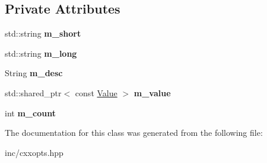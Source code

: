 \subsection*{Private Attributes}
\begin{DoxyCompactItemize}
\item 
std\+::string {\bfseries m\+\_\+short}\hypertarget{classcxxopts_1_1OptionDetails_a4454eb1ffedcf5656ab408da51542dad}{}\label{classcxxopts_1_1OptionDetails_a4454eb1ffedcf5656ab408da51542dad}

\item 
std\+::string {\bfseries m\+\_\+long}\hypertarget{classcxxopts_1_1OptionDetails_a15317e92ab6acd722736d8a6ef0dfab0}{}\label{classcxxopts_1_1OptionDetails_a15317e92ab6acd722736d8a6ef0dfab0}

\item 
String {\bfseries m\+\_\+desc}\hypertarget{classcxxopts_1_1OptionDetails_aa34bf6a94eeb9b914b96344f52519e16}{}\label{classcxxopts_1_1OptionDetails_aa34bf6a94eeb9b914b96344f52519e16}

\item 
std\+::shared\+\_\+ptr$<$ const \hyperlink{classcxxopts_1_1Value}{Value} $>$ {\bfseries m\+\_\+value}\hypertarget{classcxxopts_1_1OptionDetails_af610b82c4f86648ac54c7d2b2639e7c0}{}\label{classcxxopts_1_1OptionDetails_af610b82c4f86648ac54c7d2b2639e7c0}

\item 
int {\bfseries m\+\_\+count}\hypertarget{classcxxopts_1_1OptionDetails_abe72cc1db4b05a00bd777badafe3a322}{}\label{classcxxopts_1_1OptionDetails_abe72cc1db4b05a00bd777badafe3a322}

\end{DoxyCompactItemize}


The documentation for this class was generated from the following file\+:\begin{DoxyCompactItemize}
\item 
inc/cxxopts.\+hpp\end{DoxyCompactItemize}
